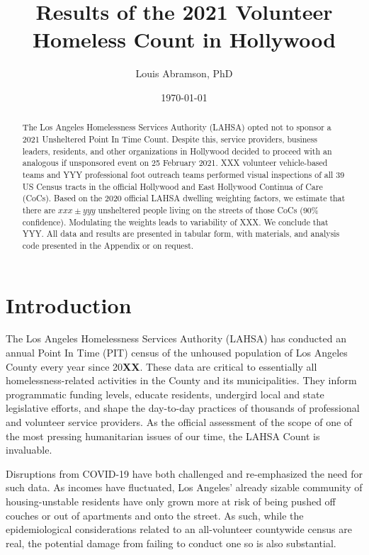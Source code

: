 \documentclass[11pt,twocolumn]{article}
\title{\bf
	Results of the 2021 Volunteer Homeless Count in Hollywood
	}
\author[1,$\ast$,$\dagger$]{Louis Abramson, PhD}%
\affil[1]{\it \small Hollywood 4WRD Homelessness Coalition, 6255 Sunset Blvd, Ste 150, LA, CA 90028}
\affil[$\ast$]{\it Central Hollywood Neighborhood Council, PO Box 93907, LA, CA 90093}
\affil[$\dagger$]{\it Carnegie Observatories, 813 Santa Barbara St, Pasadena, CA 91101}
\affil[ ]{\href{mailto:labramson@carnegiescience.edu}{labramson@carnegiescience.edu}}
\date{\today}                                           %
\def\bfr{\bf\color{red}}
\begin{document}
\maketitle

\begin{abstract}

The Los Angeles Homelessness Services Authority (LAHSA) opted not to sponsor a 2021 Unsheltered 
Point In Time Count. Despite this, service providers, business leaders, residents, and other organizations
in Hollywood decided to proceed with an analogous if unsponsored event on 25 February 2021. XXX 
volunteer vehicle-based teams and YYY professional foot outreach teams performed visual inspections of
all 39 US Census tracts in the official Hollywood and East Hollywood Continua of Care (CoCs). Based on 
the 2020 official LAHSA dwelling weighting factors, we estimate that there are $xxx\pm yyy$ unsheltered 
people living on the streets of those CoCs (90\% confidence). Modulating the weights leads to variability
of XXX. We conclude that YYY. All data and results are presented in tabular form, with materials, and
analysis code presented in the Appendix or on request.

\end{abstract}

\section{Introduction}
\label{sec:intro}

The Los Angeles Homelessness Services Authority (LAHSA) has conducted an annual Point In Time (PIT) 
census of the unhoused population of Los Angeles County every year since 20{\bfr XX}. These data are critical to 
essentially all homelessness-related activities in the County and its municipalities. They inform programmatic
funding levels, educate residents, undergird local and state legislative efforts, and shape the day-to-day 
practices of thousands of professional and volunteer service providers. As the official assessment of the 
scope of one of the most pressing humanitarian issues of our time, the LAHSA Count is invaluable.

Disruptions from COVID-19 have both challenged and re-emphasized the need for such data. As incomes 
have fluctuated, Los Angeles' already sizable community of housing-unstable residents have only grown more
at risk of being pushed off couches or out of apartments and onto the street. As such, while the 
epidemiological considerations related to an all-volunteer countywide census are real, the potential 
damage from failing to conduct one so is also substantial.
\end{document}

